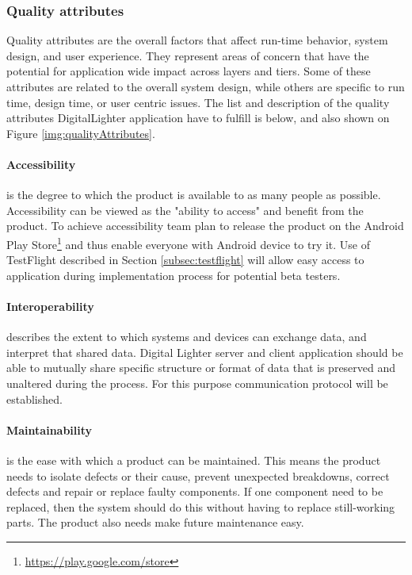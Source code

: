 \subsubsection{Quality attributes}
\label{sec:quality_attributes}
Quality attributes are the overall factors that affect run-time behavior, system design, and user experience. They represent areas of concern that have the potential for application wide impact across layers and tiers. Some of these attributes are related to the overall system design, while others are specific to run time, design time, or user centric issues. The list and description of the quality attributes DigitalLighter application have to fulfill is below, and also shown on Figure \ref{img:qualityAttributes}.

\paragraph{Accessibility}
is the degree to which the product is available to as many people as possible. 
Accessibility can be viewed as the "ability to access" and benefit from the product. 
To achieve accessibility team plan to release the product on the Android Play Store\footnote{\url{https://play.google.com/store}} and thus enable everyone with Android device to try it. Use of TestFlight described in Section \ref{subsec:testflight} will allow easy access to application during implementation process for potential beta testers.

\paragraph{Interoperability}
describes the extent to which systems and devices can exchange data, and interpret that shared data. Digital Lighter server and client application should be able to mutually share specific structure or format of data that is preserved and unaltered during the process. For this purpose communication protocol will be established.

\paragraph{Maintainability}
is the ease with which a product can be maintained. This means the product needs to isolate defects or their cause, prevent unexpected breakdowns, correct defects and repair or replace faulty components. If one component need to be replaced, then the system should do this without having to replace still-working parts. The product also needs make future maintenance easy. 

